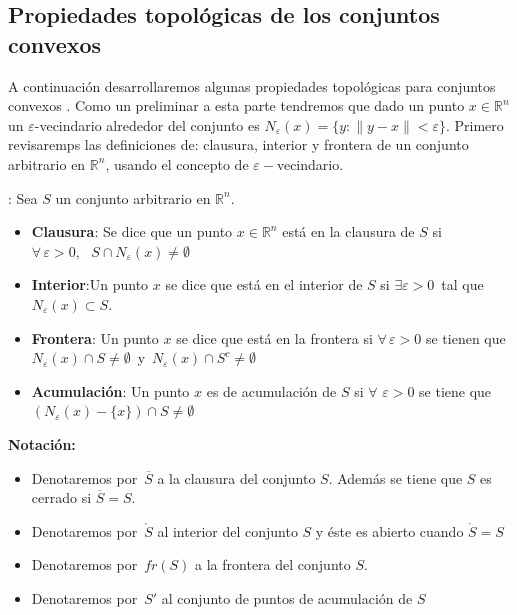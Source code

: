 \subsection{Propiedades topol\'ogicas de los conjuntos convexos}

A continuaci\'on desarrollaremos algunas propiedades topol\'ogicas para conjuntos convexos \cite{no-lineal}. Como 
un preliminar a esta parte tendremos que dado un punto $x \in \mathbb{R}^n$ un 
$\varepsilon$-vecindario alrededor del conjunto es $N_{\varepsilon}(x)= \{y: \parallel y - x \parallel < \varepsilon\}$.
Primero revisaremps las definiciones de: clausura, interior y frontera de un conjunto arbitrario en $\mathbb{R}^n$,
usando el concepto de $\varepsilon-$vecindario.\\

{: Sea $S$ un conjunto arbitrario en $\mathbb{R}^n$. 
\begin{itemize}
   \item {\bf Clausura}: Se dice que un punto $x \in \mathbb{R}^n$ est\'a en la clausura de $S$ si \linebreak
	 $\forall \, \varepsilon > 0, \,\,\,\,S\cap N_{\varepsilon}(x) \neq \emptyset $
   \item {\bf Interior}:Un punto $x$ se dice que est\'a en el interior de $S$ si \linebreak
	 $\exists \varepsilon > 0$\, tal que $N_{\varepsilon}(x) \subset S$.
   \item {\bf Frontera}: Un punto $x$ se dice que est\'a en la frontera si $\forall \, \varepsilon > 0$ se tienen que \linebreak
	 $N_{\varepsilon}(x) \cap S \neq \emptyset\,$ y $\,N_{\varepsilon}(x) \cap S^{c} \neq \emptyset$
   \item {\bf Acumulaci\'on}: Un punto $x$ es de acumulaci\'on de $S$ si \linebreak
	 $\forall \,\, \varepsilon > 0$ se tiene que $(N_{\varepsilon}(x)-\{x\}) \cap S \neq \emptyset$
\end{itemize}
\label{top-notable}}

\medskip

\textbf{Notaci\'on:}
\begin{itemize}
   \item Denotaremos por $\, \overline{S}$ a la clausura del conjunto $S$. Adem\'as se tiene que $S$ es cerrado si $\overline{S} = S$.
   \item Denotaremos por $\, \mathring{S}$ al interior del conjunto $S$ y \'este es abierto cuando $\mathring{S}=S$
   \item Denotaremos por $\,fr(S)$ a la frontera del conjunto $S$.
   \item Denotaremos por $\, S'$ al conjunto de puntos de acumulaci\'on de $S$
\end{itemize}

